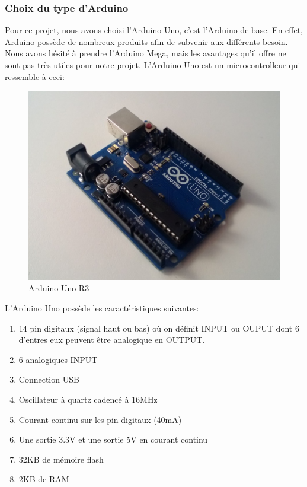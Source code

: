 \documentclass[a4paper,12pt]{article}
\begin{document}
{\subsubsection{Choix du type d'Arduino}
Pour ce projet, nous avons choisi l'Arduino Uno, c'est l'Arduino de base. En effet, Arduino possède de nombreux produits afin de subvenir aux différents besoin. Nous avons hésité à prendre l'Arduino Mega, mais les avantages qu'il offre ne sont pas très utiles pour notre projet. L'Arduino Uno est un microcontrolleur qui ressemble à ceci:\\

\begin{figure}[h]
\begin{center}
\includegraphics[scale=0.38]{arduino_uno.jpg}
\caption{Arduino Uno R3}
\end{center}
\end{figure}
L'Arduino Uno possède les caractéristiques suivantes:
\begin{enumerate}
\item 14 pin digitaux (signal haut ou bas) où on définit INPUT ou OUPUT dont 6 d'entres eux peuvent être analogique en OUTPUT.
\item  6 analogiques INPUT
\item Connection USB
\item Oscillateur à quartz cadencé à 16MHz
\item Courant continu sur les pin digitaux (40mA)
\item Une sortie 3.3V et une sortie 5V en courant continu
\item 32KB de mémoire flash
\item 2KB de RAM

\end{enumerate}}
\end{document}
